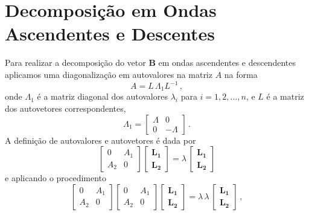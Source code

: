 \section{Decomposi\c{c}\~ao em Ondas Ascendentes e Descentes}

Para realizar a decomposi\c{c}\~ao do vetor $\mathbf{B}$ em ondas ascendentes e descendentes aplicamos uma diagonaliza\c{c}\~ao em autovalores na matriz $A$ na forma
\begin{equation}\label{eq.diagonalizacao}
A=L\,\Lambda_1L^{-1}\,,
\end{equation}
onde $\Lambda_1$ \'e a matriz diagonal dos autovalores $\lambda_i$ para $i=1,2,...,n$, e $L$ \'e a matriz dos autovetores correspondentes,
\begin{equation*}
\Lambda_1=
\begin{bmatrix}
\Lambda&0\\
0&-\Lambda
\end{bmatrix}\,.
\end{equation*} 
A defini\c{c}\~ao de autovalores e autovetores \'e dada por
\begin{equation}\label{eq.sist_autovalores}
\begin{bmatrix}
0&A_1\\
A_2&0
\end{bmatrix}
\begin{bmatrix}
\mathbf{L_1}\\
\mathbf{L_2}
\end{bmatrix}
=
\lambda\,
\begin{bmatrix}
\mathbf{L_1}\\
\mathbf{L_2}
\end{bmatrix}
\end{equation}
e aplicando o procedimento
\begin{equation*}
\begin{bmatrix}
0&A_1\\
A_2&0
\end{bmatrix}
\begin{bmatrix}
0&A_1\\
A_2&0
\end{bmatrix}
\begin{bmatrix}
\mathbf{L_1}\\
\mathbf{L_2}
\end{bmatrix}
=
\lambda\,\lambda\,
\begin{bmatrix}
\mathbf{L_1}\\
\mathbf{L_2}
\end{bmatrix}\,,
\end{equation*}
